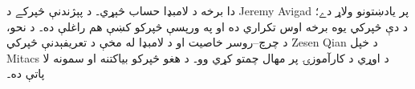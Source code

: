 \documentclass[../../include/open-logic-part]{subfiles}
\begin{document}

\begin{editorial}
دا برخه د لامبډا حساب څېړي۔ د پېژندنې څپرکے د Jeremy Avigad پر
يادښتونو ولاړ دے؛ د دې څپرکي يوه برخه اوس تکراري ده او په
ورپسې څپرکو کښې هم راغلې ده۔ د نحو، د چرچ--روسر خاصيت او د لامبډا له مخې
د تعريفېدنې څپرکي Zesen Qian د خپل Mitacs د اوړي د کارآموزۍ پر مهال
چمتو کړي وو۔ د هغو څپرکو بياکتنه او سمونه لا پاتې ده۔
\end{editorial}





\OLEndPartHook
\end{document}
